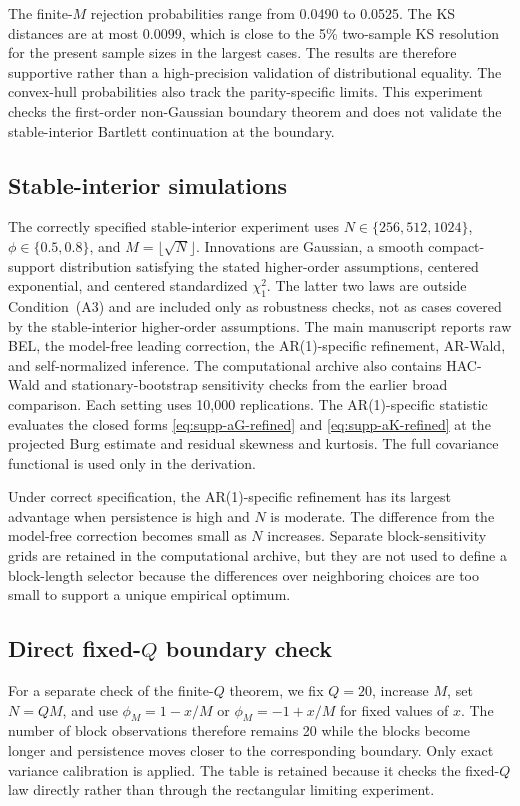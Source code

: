 \documentclass[12pt]{article}
\theoremstyle{remark}
\begin{document}
The finite-$M$ rejection probabilities range from 0.0490 to 0.0525. The KS distances are at most $0.0099$, which is close to the 5\% two-sample KS resolution for the present sample sizes in the largest cases. The results are therefore supportive rather than a high-precision validation of distributional equality. The convex-hull probabilities also track the parity-specific limits. This experiment checks the first-order non-Gaussian boundary theorem and does not validate the stable-interior Bartlett continuation at the boundary.

\subsection{Stable-interior simulations}
The correctly specified stable-interior experiment uses $N\in\{256,512,1024\}$, $\phi\in\{0.5,0.8\}$, and $M=\lfloor\sqrt N\rfloor$. Innovations are Gaussian, a smooth compact-support distribution satisfying the stated higher-order assumptions, centered exponential, and centered standardized $\chi_1^2$. The latter two laws are outside Condition~(A3) and are included only as robustness checks, not as cases covered by the stable-interior higher-order assumptions. The main manuscript reports raw BEL, the model-free leading correction, the AR(1)-specific refinement, AR-Wald, and self-normalized inference. The computational archive also contains HAC-Wald and stationary-bootstrap sensitivity checks from the earlier broad comparison. Each setting uses 10,000 replications. The AR(1)-specific statistic evaluates the closed forms \eqref{eq:supp-aG-refined} and \eqref{eq:supp-aK-refined} at the projected Burg estimate and residual skewness and kurtosis. The full covariance functional is used only in the derivation.

Under correct specification, the AR(1)-specific refinement has its largest advantage when persistence is high and $N$ is moderate. The difference from the model-free correction becomes small as $N$ increases. Separate block-sensitivity grids are retained in the computational archive, but they are not used to define a block-length selector because the differences over neighboring choices are too small to support a unique empirical optimum.

\subsection{Direct fixed-$Q$ boundary check}
For a separate check of the finite-$Q$ theorem, we fix $Q=20$, increase $M$, set $N=QM$, and use $\phi_M=1-x/M$ or $\phi_M=-1+x/M$ for fixed values of $x$. The number of block observations therefore remains 20 while the blocks become longer and persistence moves closer to the corresponding boundary. Only exact variance calibration is applied. The table is retained because it checks the fixed-$Q$ law directly rather than through the rectangular limiting experiment.
\end{document}
